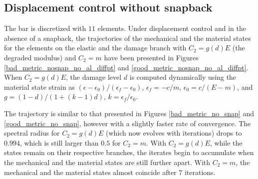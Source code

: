 \documentclass[10pt]{cas-sc}
\newenvironment{deletedblock}
{\begin{tcbstrikeout}\color{red}}
	{\end{tcbstrikeout}}
\begin{document}
\begin{deletedblock}
\subsection*{Displacement control without snapback}
The bar is discretized with $11$ elements. Under displacement control and in the absence of a snapback, the trajectories of the mechanical and the material states for the elements on the elastic and the damage branch with $C_2 = g(d) E$ (the degraded modulus) and $C_2 = m$ have been presented in Figures \ref{bad_metric_nosnap_no_al_diffpt} and \ref{good_metric_nosnap_no_al_diffpt}. When $C_2 = g(d) E$, the damage level $d$ is computed dynamically using the material state strain as $(\epsilon - \epsilon_0)/(\epsilon_f - \epsilon_0)$, $\epsilon_f=-c/m$, $\epsilon_0=c/(E-m)$, and $g=(1-d)/(1+(k-1)d)$, $k=\epsilon_f/\epsilon_0$.



The trajectory is similar to that presented in Figures \ref{bad_metric_no_snap} and \ref{good_metric_no_snap}, however with a slightly faster rate of convergence. The spectral radius for $C_2 = g(d) E$ (which now evolves with iterations) drops to $0.994$, which is still larger than $0.5$ for $C_2=m$. With $C_2 = g(d) E$, while the states remain on their respective branches, the iterates begin to accumulate when the mechanical and the material states are still further apart. With $C_2 = m$, the mechanical and the material states almost coincide after $7$ iterations.
\end{deletedblock}
\end{document}
